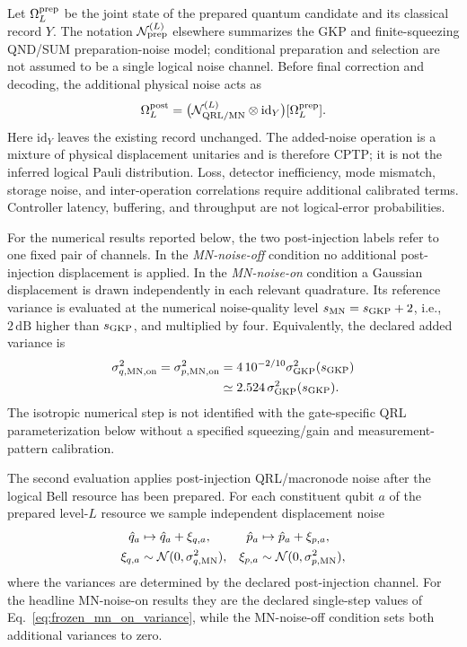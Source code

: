 \documentclass[aps,
prx,
superscriptaddress,
reprint,
longbibliography,
floatfix]{revtex4-2}
\begin{document}
Let $\Omega_L^{\rm prep}$ be the joint state of the prepared quantum candidate and its classical record $Y$. The notation $\mathcal N_{\rm prep}^{(L)}$ elsewhere summarizes the GKP and finite-squeezing QND/SUM preparation-noise model; conditional preparation and selection are not assumed to be a single logical noise channel. Before final correction and decoding, the additional physical noise acts as
\begin{equation}
\Omega_L^{\rm post}
=\bigl(\mathcal N_{\rm QRL/MN}^{(L)}\otimes\mathrm{id}_{Y}\bigr)
 [\Omega_L^{\rm prep}].
\label{eq:noise_scope_summary}
\end{equation}
Here $\mathrm{id}_{Y}$ leaves the existing record unchanged. The added-noise operation is a mixture of physical displacement unitaries and is therefore CPTP; it is not the inferred logical Pauli distribution. Loss, detector inefficiency, mode mismatch, storage noise, and inter-operation correlations require additional calibrated terms. Controller latency, buffering, and throughput are not logical-error probabilities.

For the numerical results reported below, the two post-injection labels refer to one fixed pair of channels. In the \emph{MN-noise-off} condition no additional post-injection displacement is applied. In the \emph{MN-noise-on} condition a Gaussian displacement is drawn independently in each relevant quadrature. Its reference variance is evaluated at the numerical noise-quality level $s_{\rm MN}=s_{\rm GKP}+2$, i.e., $2\,\mathrm{dB}$ higher than $s_{\rm GKP}$, and multiplied by four. Equivalently, the declared added variance is
\begin{align}
\sigma_{q,{\rm MN,on}}^{2}=\sigma_{p,{\rm MN,on}}^{2}
&=4\,10^{-2/10}\sigma_{\rm GKP}^{2}(s_{\rm GKP}) \nonumber\\
&\simeq2.524\,\sigma_{\rm GKP}^{2}(s_{\rm GKP}).
\label{eq:frozen_mn_on_variance}
\end{align}
The isotropic numerical step is not identified with the gate-specific QRL parameterization below without a specified squeezing/gain and measurement-pattern calibration.

The second evaluation applies post-injection QRL/macronode noise after the logical Bell resource has been prepared. For each constituent qubit $a$ of the prepared level-$L$ resource we sample independent displacement noise
\begin{align}
 \hat q_a &\mapsto \hat q_a+\xi_{q,a},
&
 \hat p_a &\mapsto \hat p_a+\xi_{p,a},
\nonumber\\
 \xi_{q,a}&\sim\mathcal N(0,\sigma_{q,{\rm MN}}^2),
&
 \xi_{p,a}&\sim\mathcal N(0,\sigma_{p,{\rm MN}}^2),
\label{eq:independent_mn_noise}
\end{align}
where the variances are determined by the declared post-injection channel. For the headline MN-noise-on results they are the declared single-step values of Eq.~\eqref{eq:frozen_mn_on_variance}, while the MN-noise-off condition sets both additional variances to zero.
\end{document}
